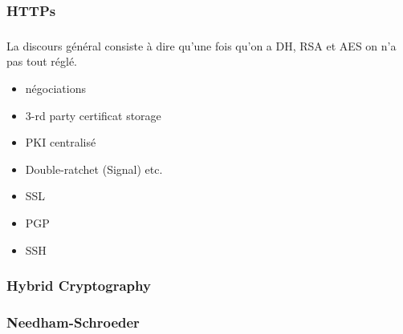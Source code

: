 \documentclass[
hyperref={pdfpagelabels=false}
,xcolor=table
]
{beamer}
\begin{document}
\begin{frame}
  \frametitle{HTTPs}
\end{frame}


\begin{frame}
  \frametitle{}
  La discours général consiste à dire qu'une fois qu'on a DH, RSA et AES on n'a pas tout réglé.
  \begin{itemize}
  \item négociations
  \item 3-rd party certificat storage
  \item PKI centralisé
  \item Double-ratchet (Signal) etc. 
  \item SSL
  \item PGP
  \item SSH
  \end{itemize}
\end{frame}


\begin{frame}
  \frametitle{}
\end{frame}


\begin{frame}
  \frametitle{Hybrid Cryptography}
\end{frame}

\begin{frame}
  \frametitle{Needham-Schroeder}
\end{frame}
\end{document}
